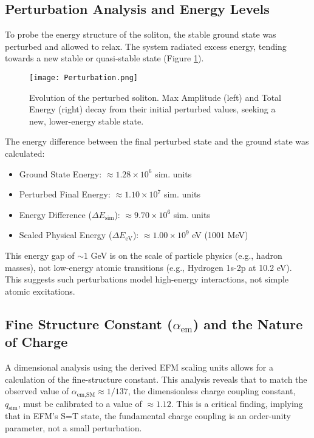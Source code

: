 \documentclass[11pt]{article}
\begin{document}
\subsection{Perturbation Analysis and Energy Levels}
To probe the energy structure of the soliton, the stable ground state was perturbed and allowed to relax. The system radiated excess energy, tending towards a new stable or quasi-stable state (Figure \ref{fig:perturbed_evolution}).
\begin{figure}[htbp]
    \centering
    \texttt{[image: Perturbation.png]} %
    \caption{Evolution of the perturbed soliton. Max Amplitude (left) and Total Energy (right) decay from their initial perturbed values, seeking a new, lower-energy stable state.}
    \label{fig:perturbed_evolution}
\end{figure}
The energy difference between the final perturbed state and the ground state was calculated:
\begin{itemize}
    \item Ground State Energy: \( \approx 1.28 \times 10^6 \) sim. units
    \item Perturbed Final Energy: \( \approx 1.10 \times 10^7 \) sim. units
    \item Energy Difference (\(\Delta E_{\text{sim}}\)): \( \approx 9.70 \times 10^6 \) sim. units
    \item Scaled Physical Energy (\(\Delta E_{\text{eV}}\)): \( \approx 1.00 \times 10^9 \) eV (1001 MeV)
\end{itemize}
This energy gap of \(\sim 1\) GeV is on the scale of particle physics (e.g., hadron masses), not low-energy atomic transitions (e.g., Hydrogen 1s-2p at 10.2 eV). This suggests such perturbations model high-energy interactions, not simple atomic excitations.

\subsection{Fine Structure Constant (\(\alpha_{\text{em}}\)) and the Nature of Charge}
A dimensional analysis using the derived EFM scaling units allows for a calculation of the fine-structure constant. This analysis reveals that to match the observed value of \(\alpha_{\text{em,SM}} \approx 1/137\), the dimensionless charge coupling constant, \(q_{\text{sim}}\), must be calibrated to a value of \textbf{\(\approx 1.12\)}. This is a critical finding, implying that in EFM's S=T state, the fundamental charge coupling is an order-unity parameter, not a small perturbation.
\end{document}
